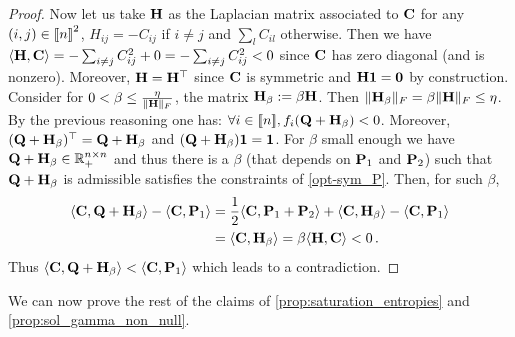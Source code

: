 \begin{proof}
Now let us take ${\mathbf{H}}$ as the Laplacian matrix associated to $\mathbf{C}$ \ie for any $(i,j) \in {[\![n]\!]}^2$, $H_{ij} = -C_{ij}$ if $i \neq j$ and $\sum_l C_{il}$ otherwise.
Then we have $\langle {\mathbf{H}}, \mathbf{C} \rangle = -\sum_{i \neq j} C_{ij}^2+ 0 = - \sum_{i \neq j} C_{ij}^2 < 0$ since $\mathbf{C}$ has zero diagonal (and is nonzero). Moreover, ${\mathbf{H}} = {\mathbf{H}}^\top$ since $\mathbf{C}$ is symmetric and ${\mathbf{H}} \bm{1} = \bm{0}$ by construction. Consider for $0 < \beta \leq \frac{\eta}{\|{\mathbf{H}}\|_F}$, the matrix ${\mathbf{H}}_{\beta} := \beta {\mathbf{H}}$. Then $\|{\mathbf{H}}_\beta\|_F = \beta \|{\mathbf{H}}\|_F \leq \eta$. By the previous reasoning one has: $\forall i \in {[\![n]\!]}, f_i({\mathbf{Q}}+{\mathbf{H}}_{\beta}) < 0$. Moreover, $({\mathbf{Q}}+{\mathbf{H}}_{\beta})^{\top} = {\mathbf{Q}}+{\mathbf{H}}_{\beta}$ and $({\mathbf{Q}}+{\mathbf{H}}_{\beta})\bm{1} = \bm{1}$. For $\beta$ small enough we have ${\mathbf{Q}}+{\mathbf{H}}_{\beta}\in \mathbb{R}_{+}^{n \times n}$ and thus there is a $\beta$ (that depends on ${\mathbf{P}}_1$ and ${\mathbf{P}}_2$) such that ${\mathbf{Q}}+{\mathbf{H}}_{\beta}$ is admissible \ie satisfies the constraints of \eqref{opt-sym_P}. Then, for such $\beta$, 
\begin{equation}
\begin{split}
\langle \mathbf{C}, {\mathbf{Q}}+{\mathbf{H}}_{\beta} \rangle- \langle \mathbf{C}, {\mathbf{P}}_1 \rangle &= \frac{1}{2} \langle \mathbf{C}, {\mathbf{P}}_1+ {\mathbf{P}}_2 \rangle + \langle \mathbf{C}, {\mathbf{H}}_{\beta} \rangle -\langle \mathbf{C}, {\mathbf{P}}_1 \rangle\\
&= \langle \mathbf{C}, {\mathbf{H}}_{\beta} \rangle = \beta \langle {\mathbf{H}}, \mathbf{C} \rangle < 0\,.
\end{split}
\end{equation}
Thus $\langle \mathbf{C}, {\mathbf{Q}}+{\mathbf{H}}_{\beta} \rangle <\langle \mathbf{C}, {\mathbf{P}}_1 \rangle$ which leads to a contradiction.
\end{proof}
We can now prove the rest of the claims of  \cref{prop:saturation_entropies} and \cref{prop:sol_gamma_non_null}.

